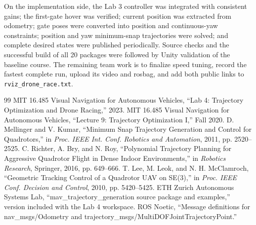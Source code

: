 \documentclass[letterpaper,10pt,conference]{IEEEtran}
\begin{document}
On the implementation side, the Lab 3 controller was integrated with consistent gains; the first-gate hover was verified; current position was extracted from odometry; gate poses were converted into position and continuous-yaw constraints; position and yaw minimum-snap trajectories were solved; and complete desired states were published periodically. Source checks and the successful build of all 20 packages were followed by Unity validation of the baseline course. The remaining team work is to finalize speed tuning, record the fastest complete run, upload its video and rosbag, and add both public links to \texttt{rviz\_drone\_race.txt}.

\begin{thebibliography}{99}
MIT 16.485 Visual Navigation for Autonomous Vehicles, ``Lab 4: Trajectory Optimization and Drone Racing,'' 2023.
MIT 16.485 Visual Navigation for Autonomous Vehicles, ``Lecture 9: Trajectory Optimization I,'' Fall 2020.
D. Mellinger and V. Kumar, ``Minimum Snap Trajectory Generation and Control for Quadrotors,'' in \emph{Proc. IEEE Int. Conf. Robotics and Automation}, 2011, pp. 2520--2525.
C. Richter, A. Bry, and N. Roy, ``Polynomial Trajectory Planning for Aggressive Quadrotor Flight in Dense Indoor Environments,'' in \emph{Robotics Research}, Springer, 2016, pp. 649--666.
T. Lee, M. Leok, and N. H. McClamroch, ``Geometric Tracking Control of a Quadrotor UAV on SE(3),'' in \emph{Proc. IEEE Conf. Decision and Control}, 2010, pp. 5420--5425.
ETH Zurich Autonomous Systems Lab, ``mav\_trajectory\_generation source package and examples,'' version included with the Lab 4 workspace.
ROS Noetic, ``Message definitions for nav\_msgs/Odometry and trajectory\_msgs/MultiDOFJointTrajectoryPoint.''
\end{thebibliography}
\end{document}

